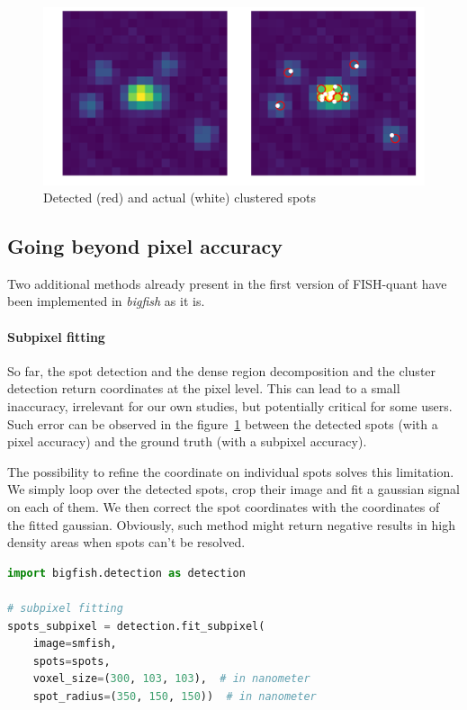 \begin{figure}[h]
    \centering
    \includegraphics[width=1\textwidth]{figures/chapter2/plot_dense_decomposition}
    \caption{Detected (red) and actual (white) clustered spots}
    \label{fig:dense_decomposition}
\end{figure}

\subsection{Going beyond pixel accuracy} \label{subsec:subpixel}

Two additional methods already present in the first version of FISH-quant\cite{mueller_fish-quant_2013} have been implemented in \emph{bigfish} as it is.

\paragraph{Subpixel fitting}

So far, the spot detection and the dense region decomposition and the cluster detection return coordinates at the pixel level.
This can lead to a small inaccuracy, irrelevant for our own studies, but potentially critical for some users.
Such error can be observed in the figure~\ref{fig:dense_decomposition} between the detected spots (with a pixel accuracy) and the ground truth (with a subpixel accuracy).

The possibility to refine the coordinate on individual spots solves this limitation.
We simply loop over the detected spots, crop their image and fit a gaussian signal on each of them.
We then correct the spot coordinates with the coordinates of the fitted gaussian.
Obviously, such method might return negative results in high density areas when spots can't be resolved.\\

\begin{minipage}{0.9\textwidth}
\begin{lstlisting}[language=Python]
import bigfish.detection as detection

# subpixel fitting
spots_subpixel = detection.fit_subpixel(
    image=smfish,
    spots=spots,
    voxel_size=(300, 103, 103),  # in nanometer
    spot_radius=(350, 150, 150))  # in nanometer
\end{lstlisting}
\end{minipage}

